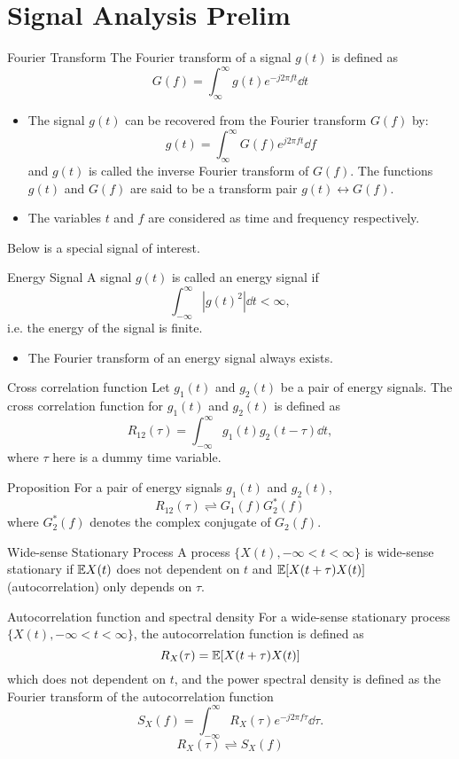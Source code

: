 \documentclass[../main.tex]{subfiles}
\begin{document}
\section{Signal Analysis Prelim}
\begin{gbox}{Fourier Transform}
    The Fourier transform of a signal $g(t)$ is defined as \[
    G(f)=\int_{\infty}^\infty g(t) e^{-j2\pi f t}\dd t
    \]
    \begin{itemize}
        \item The signal $g(t)$ can be recovered from the Fourier transform $G(f)$ by: \[
        g(t) = \int_{\infty}^\infty G(f) e^{j2\pi ft}\dd f
        \] and $g(t)$ is called the inverse Fourier transform of $G(f)$. The functions $g(t)$ and $G(f)$ are said to be a transform pair $g(t)\leftrightarrow G(f)$.
        \item The variables $t$ and $f$ are considered as time and frequency respectively.
    \end{itemize}
\end{gbox}
Below is a special signal of interest.
\begin{gbox}{Energy Signal}
    A signal $g(t)$ is called an energy signal if \[
    \int_{-\infty}^\infty |g(t)^2|\dd t < \infty,
    \] i.e. the energy of the signal is finite.
    \begin{itemize}
        \item The Fourier transform of an energy signal always exists.
    \end{itemize}
\end{gbox}
\begin{gbox}{Cross correlation function}
    Let $g_1(t)$ and $g_2(t)$ be a pair of energy signals. The cross correlation function for $g_1(t)$ and $g_2(t)$ is defined as \[
    R_{12}(\tau) = \int_{-\infty}^\infty g_1(t)g_2(t-\tau)\dd t,
    \] where $\tau$ here is a dummy time variable.
\end{gbox}
\begin{bbox}{Proposition}
    For a pair of energy signals $g_1(t)$ and $g_2(t)$, \[
    R_{12}(\tau) \rightleftharpoons G_1(f) G_2^*(f)
    \] where $G_2^*(f)$ denotes the complex conjugate of $G_2(f)$.
\end{bbox}
\begin{gbox}{Wide-sense Stationary Process}
    A process $\{X(t),-\infty < t <\infty\}$ is wide-sense stationary if $\mathbb{E} X(t)$ does not dependent on $t$ and $\mathbb{E}[X(t+\tau)X(t)]$ (autocorrelation) only depends on $\tau.$
\end{gbox}
\begin{gbox}{Autocorrelation function and spectral density}
    For a wide-sense stationary process $\{X(t),-\infty < t <\infty\}$, the autocorrelation function is defined as \[
    R_X(\tau) = \mathbb{E}[X(t+\tau)X(t)]
    \] which does not dependent on $t$, and the power spectral density is defined as the Fourier transform of the autocorrelation function \[
    S_X(f) = \int_{-\infty}^{\infty}R_X(\tau)e^{-j2\pi f\tau}\dd \tau.
    \]
    \[
    R_X(\tau) \rightleftharpoons S_X(f)
    \]
\end{gbox}
\end{document}
